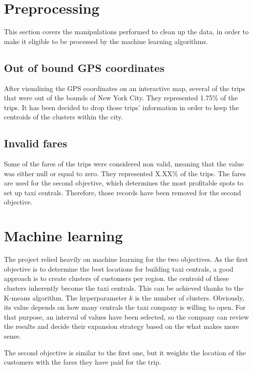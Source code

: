 \documentclass[a4paper]{article}
\begin{document}
\section{Preprocessing}
This section covers the manipulations performed to clean up the data, in order to make it eligible to be processed by the machine learning algorithms.


\subsection{Out of bound GPS coordinates}
After visualizing the GPS coordinates on an interactive map, several of the trips that were out of the bounds of New York City. They represented 1.75\% of the trips. It has been decided to drop those trips' information in order to keep the centroids of the clusters within the city.


\subsection{Invalid fares}
Some of the fares of the trips were considered non valid, meaning that the value was either null or equal to zero. They represented X.XX\% of the trips. The fares are used for the second objective, which determines the most profitable spots to set up taxi centrals. Therefore, those records have been removed for the second objective.



\section{Machine learning}
The project relied heavily on machine learning for the two objectives. As the first objective is to determine the best locations for building taxi centrals, a good approach is to create clusters of customers per region. the centroid of these clusters inherently become the taxi centrals. This can be achieved thanks to the K-means algorithm. The hyperparameter $k$ is the number of clusters. Obviously, its value depends on how many centrals the taxi company is willing to open. For that purpose, an interval of values have been selected, so the company can review the results and decide their expansion strategy based on the what makes more sense.

The second objective is similar to the first one, but it weights the location of the customers with the fares they have paid for the trip.
\end{document}
